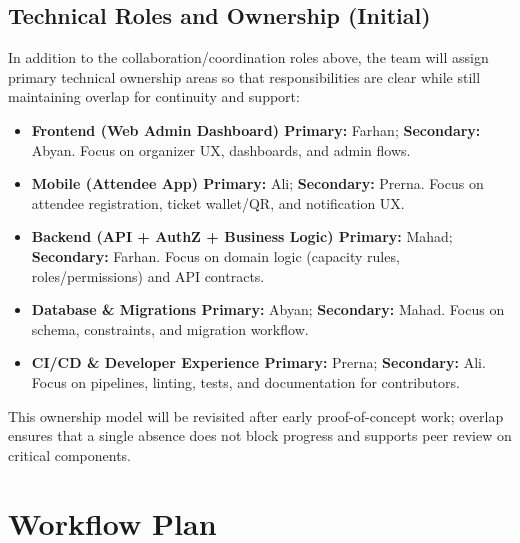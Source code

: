 \documentclass{article}
\begin{document}
\subsection*{Technical Roles and Ownership (Initial)}
\noindent In addition to the collaboration/coordination roles above, the team will assign primary technical ownership areas so that responsibilities are clear while still maintaining overlap for continuity and support:
\begin{itemize}
    \item \textbf{Frontend (Web Admin Dashboard) Primary:} Farhan; \textbf{Secondary:} Abyan. Focus on organizer UX, dashboards, and admin flows.
    \item \textbf{Mobile (Attendee App) Primary:} Ali; \textbf{Secondary:} Prerna. Focus on attendee registration, ticket wallet/QR, and notification UX.
    \item \textbf{Backend (API + AuthZ + Business Logic) Primary:} Mahad; \textbf{Secondary:} Farhan. Focus on domain logic (capacity rules, roles/permissions) and API contracts.
    \item \textbf{Database \& Migrations Primary:} Abyan; \textbf{Secondary:} Mahad. Focus on schema, constraints, and migration workflow.
    \item \textbf{CI/CD \& Developer Experience Primary:} Prerna; \textbf{Secondary:} Ali. Focus on pipelines, linting, tests, and documentation for contributors.
\end{itemize}
\noindent This ownership model will be revisited after early proof-of-concept work; overlap ensures that a single absence does not block progress and supports peer review on critical components.




\section{Workflow Plan}
\end{document}
